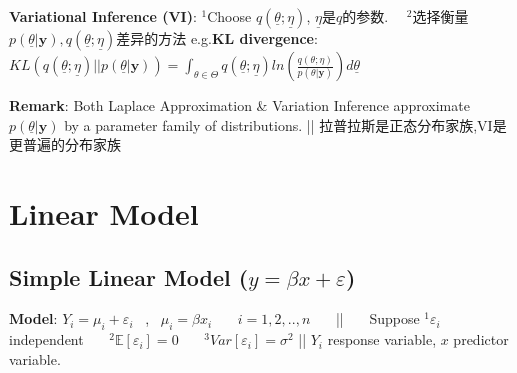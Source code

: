 \documentclass[9pt]{article}
\begin{document}
\textbf{Variational Inference (VI)}: {\scriptsize $^1$Choose $q(\underline{\theta};\underline{\eta})$, $\underline{\eta}$是$q$的参数. \ \ $^2$选择衡量$p(\underline{\theta}|\mathbf{y}),q(\underline{\theta};\underline{\eta})$差异的方法 e.g.\textbf{KL divergence}: $KL(q(\underline{\theta};\underline{\eta})||p(\underline{\theta}|\mathbf{y}))=\int_{\theta\in\Theta}q(\underline{\theta};\underline{\eta})ln(\frac{q(\theta;\eta)}{p(\theta|\mathbf{y})})d\underline{\theta}$}


\textbf{Remark}: {\scriptsize Both Laplace Approximation \& Variation Inference approximate $p(\underline{\theta}|\mathbf{y})$ by a parameter family of distributions. || 拉普拉斯是正态分布家族,VI是更普遍的分布家族}
\vspace{-5pt}


\section{Linear Model}
\vspace{-5pt}

\subsection{Simple Linear Model ($y=\beta x+\varepsilon$)}

\textbf{Model}: {\small $Y_i=\mu_i+\varepsilon_i$ \ , \ $\mu_i=\beta x_i$ \ \ \ $i=1,2,..,n$ \ \ \ || \ \ \ Suppose $^1\varepsilon_i$ independent \ \ \ $^2\mathbb{E}[\varepsilon_i]=0$ \ \ \ $^3Var[\varepsilon_i]=\sigma^2$} || {\footnotesize $Y_i$ response variable, $x$ predictor variable.}
\end{document}
